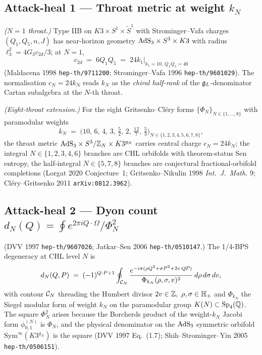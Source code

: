 \subsection*{Attack-heal 1 --- Throat metric at weight $k_N$}

\ClaimStatusTheorem{} \emph{($N=1$ throat.)} Type IIB on $K3\times
S^1\times\widetilde S^1$ with Strominger--Vafa charges $(Q_1,Q_5,n,J)$
has near-horizon geometry $\mathrm{AdS}_3\times S^3\times K3$ with radius
$\ell_3^2=4G_3 c_{2d}/3$; at $N=1$,
\[
  c_{2d}\;=\;6 Q_1 Q_5\;=\;24 k_1\bigl|_{k_1=10,\,Q_1Q_5=40}
\]
(Maldacena 1998 \texttt{hep-th/9711200}; Strominger--Vafa 1996
\texttt{hep-th/9601029}). The normalisation $c_N=24 k_N$ reads
$k_N$ as the \emph{chiral half-rank} of the $\mathfrak{g}_{L}$-denominator
Cartan subalgebra at the $N$-th throat.

\ClaimStatusConjectured{} \emph{(Eight-throat extension.)} For the
eight Gritsenko--Cl\'ery forms $\{\Phi_N\}_{N\in\{1,\dots,8\}}$ with
paramodular weights
\[
  k_N\;=\;\bigl(10,\,6,\,4,\,3,\,\tfrac{5}{2},\,2,\,\tfrac{12}{7},
    \,\tfrac{5}{3}\bigr)_{N\in\{1,2,3,4,5,6,7,8\}},
\]
the throat metric $\mathrm{AdS}_3\times S^3/\mathbb{Z}_N\times K3^{g_N}$ carries
central charge $c_N=24 k_N$; the integral $N\in\{1,2,3,4,6\}$
branches are CHL orbifolds with theorem-status Sen entropy, the
half-integral $N\in\{5,7,8\}$ branches are conjectural fractional-orbifold
completions (Lorgat 2020 Conjecture~1; Gritsenko--Nikulin 1998
\emph{Int.\ J.\ Math.} 9; Cl\'ery--Gritsenko 2011
\texttt{arXiv:0812.3962}).

\subsection*{Attack-heal 2 --- Dyon count $d_N(Q)=\oint e^{2\pi i
    Q\cdot\Omega}/\Phi_N^2$}

\ClaimStatusTheorem{} (DVV 1997 \texttt{hep-th/9607026};
Jatkar--Sen 2006 \texttt{hep-th/0510147}.) The 1/4-BPS degeneracy
at CHL level $N$ is
\[
  d_N(Q,P)\;=\;(-1)^{Q\cdot P+1}\oint_{\mathcal{C}_N}
  \frac{e^{-i\pi(\rho Q^{2}+\sigma P^{2}+2v\,Q\!\cdot\!P)}}
    {\Phi_{k_N}(\rho,\sigma,v)^{2}}\,
  d\rho\,d\sigma\,dv,
\]
with contour $\mathcal{C}_N$ threading the Humbert divisor
$2v\in\mathbb{Z},\ \rho,\sigma\in\mathbb{H}_+$ and $\Phi_{k_N}$ the Siegel
modular form of weight $k_N$ on the paramodular group
$K(N)\subset\mathrm{Sp}_4(\mathbb{Q})$. The square $\Phi_N^2$ arises because
the Borcherds product of the weight-$k_N$ Jacobi form
$\phi^{(N)}_{0,1}$ is $\Phi_N$, and the physical
denominator on the $\mathrm{AdS}_3$ symmetric orbifold
$\mathrm{Sym}^\infty(K3^{g_N})$ is the square
(DVV 1997 Eq.~(1.7); Shih--Strominger--Yin 2005
\texttt{hep-th/0506151}).

